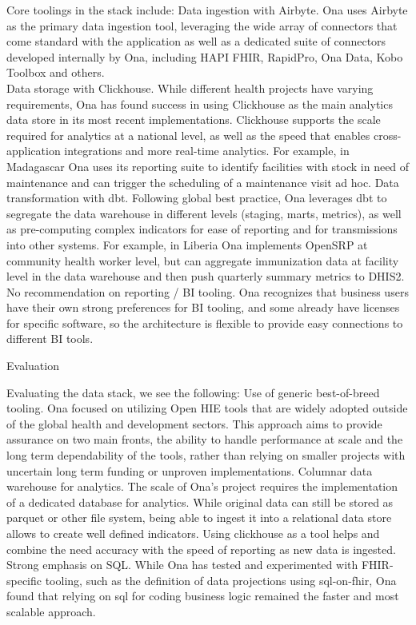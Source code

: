 \documentclass[
  authoryear]{elsarticle}
\begin{document}
Core toolings in the stack include: Data ingestion with Airbyte. Ona
uses Airbyte as the primary data ingestion tool, leveraging the wide
array of connectors that come standard with the application as well as a
dedicated suite of connectors developed internally by Ona, including
HAPI FHIR, RapidPro, Ona Data, Kobo Toolbox and others.\\
Data storage with Clickhouse. While different health projects have
varying requirements, Ona has found success in using Clickhouse as the
main analytics data store in its most recent implementations. Clickhouse
supports the scale required for analytics at a national level, as well
as the speed that enables cross-application integrations and more
real-time analytics. For example, in Madagascar Ona uses its reporting
suite to identify facilities with stock in need of maintenance and can
trigger the scheduling of a maintenance visit ad hoc. Data
transformation with dbt. Following global best practice, Ona leverages
dbt to segregate the data warehouse in different levels (staging, marts,
metrics), as well as pre-computing complex indicators for ease of
reporting and for transmissions into other systems. For example, in
Liberia Ona implements OpenSRP at community health worker level, but can
aggregate immunization data at facility level in the data warehouse and
then push quarterly summary metrics to DHIS2. No recommendation on
reporting / BI tooling. Ona recognizes that business users have their
own strong preferences for BI tooling, and some already have licenses
for specific software, so the architecture is flexible to provide easy
connections to different BI tools.

Evaluation

Evaluating the data stack, we see the following: Use of generic
best-of-breed tooling. Ona focused on utilizing Open HIE tools that are
widely adopted outside of the global health and development sectors.
This approach aims to provide assurance on two main fronts, the ability
to handle performance at scale and the long term dependability of the
tools, rather than relying on smaller projects with uncertain long term
funding or unproven implementations. Columnar data warehouse for
analytics. The scale of Ona's project requires the implementation of a
dedicated database for analytics. While original data can still be
stored as parquet or other file system, being able to ingest it into a
relational data store allows to create well defined indicators. Using
clickhouse as a tool helps and combine the need accuracy with the speed
of reporting as new data is ingested.\\
Strong emphasis on SQL. While Ona has tested and experimented with
FHIR-specific tooling, such as the definition of data projections using
sql-on-fhir, Ona found that relying on sql for coding business logic
remained the faster and most scalable approach.
\end{document}
